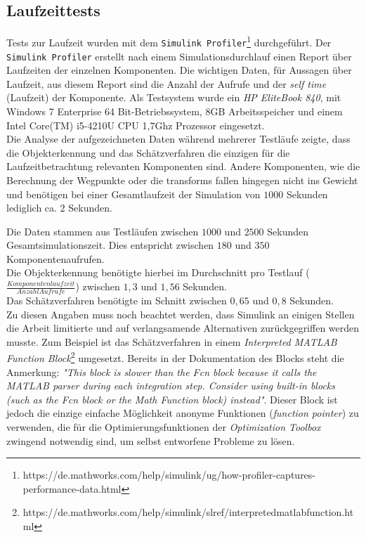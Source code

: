 \subsection{Laufzeittests}
\label{sec_laufzeit}
Tests zur Laufzeit wurden mit dem \texttt{Simulink Profiler}\footnote{https://de.mathworks.com/help/simulink/ug/how-profiler-captures-performance-data.html} durchgeführt. Der \texttt{Simulink Profiler} erstellt nach einem Simulationsdurchlauf einen Report über Laufzeiten der einzelnen Komponenten. Die wichtigen Daten, für Aussagen über Laufzeit, aus diesem Report sind die Anzahl der Aufrufe und der \textit{self time} (Laufzeit) der Komponente. Als Testsystem wurde ein \textit{HP EliteBook 840}, mit Windows 7 Enterprise 64 Bit-Betriebssystem, $8$GB Arbeitsspeicher und einem Intel Core(TM) i5-4210U CPU 1,7Ghz Prozessor eingesetzt. \\
Die Analyse der aufgezeichneten Daten während mehrerer Testläufe zeigte, dass die Objekterkennung und das Schätzverfahren die einzigen für die Laufzeitbetrachtung relevanten Komponenten sind. Andere Komponenten, wie die Berechnung der Wegpunkte oder die \glspl{transform} fallen hingegen nicht ins Gewicht und benötigen bei einer Gesamtlaufzeit der Simulation von $1000$ Sekunden lediglich ca. $2$ Sekunden. 

Die Daten stammen aus Testläufen zwischen $1000$ und $2500$ Sekunden Gesamtsimulationszeit. Dies entspricht zwischen $180$ und $350$ Komponentenaufrufen.\\
Die Objekterkennung benötigte hierbei im Durchschnitt pro Testlauf ($\frac{Komponentenlaufzeit}{Anzahl Aufrufe}$) zwischen $1,3$ und $1,56$ Sekunden.\\
Das Schätzverfahren benötigte im Schnitt zwischen $0,65$ und $0,8$ Sekunden.\\

Zu diesen Angaben muss noch beachtet werden, dass Simulink an einigen Stellen die Arbeit limitierte und auf verlangsamende Alternativen zurückgegriffen werden musste. Zum Beispiel ist das Schätzverfahren in einem \textit{Interpreted MATLAB Function Block}\footnote{https://de.mathworks.com/help/simulink/slref/interpretedmatlabfunction.html} umgesetzt. Bereits in der Dokumentation des Blocks steht die Anmerkung: \textit{"This block is slower than the Fcn block because it calls the MATLAB parser during each integration step. Consider using built-in blocks (such as the Fcn block or the Math Function block) instead"}. Dieser Block ist jedoch die einzige einfache Möglichkeit anonyme Funktionen (\textit{function pointer}) zu verwenden, die für die Optimierungsfunktionen der \textit{Optimization Toolbox} zwingend notwendig sind, um selbst entworfene Probleme zu lösen.

%

